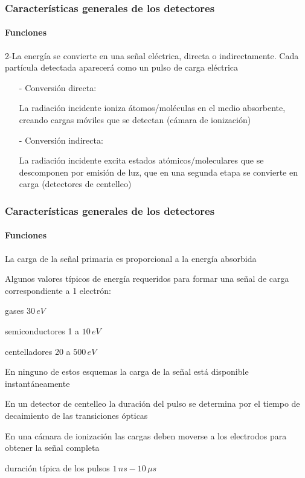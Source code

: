 \documentclass{beamer}
\begin{document}
\begin{frame}
\frametitle{Caracter\'isticas generales de los detectores}
\framesubtitle{{\color{blue}Funciones}}
\begin{block}{2-La energ\'ia se convierte en una señal el\'ectrica, directa o
indirectamente. Cada part\'icula detectada aparecer\'a como un pulso de carga
el\'ectrica}
\begin{itemize}
\item[-] {\color[rgb]{0.5,0,0.13}Conversi\'on directa:}

La radiaci\'on incidente ioniza \'atomos/mol\'eculas en el medio absorbente,
creando cargas m\'oviles que se detectan (c\'amara de ionizaci\'on)

\item[-] {\color[rgb]{0.5,0,0.13}Conversi\'on indirecta:}

La radiaci\'on incidente excita estados at\'omicos/moleculares que se descomponen
por emisi\'on de luz, que en una segunda etapa se convierte en carga (detectores
de centelleo)
\end{itemize}
\end{block}
\end{frame} 

\begin{frame}
\frametitle{Caracter\'isticas generales de los detectores}
\framesubtitle{{\color{blue}Funciones}}
\small{{\color{blue}La carga de la señal primaria es proporcional a la energ\'ia
absorbida}}

\small{Algunos valores t\'ipicos de energ\'ia requeridos para formar una señal de carga
correspondiente a 1 electr\'on:}
\begin{center}
gases\hspace{2cm}   \alert{$30\,eV$}

semiconductores\hspace{1cm}   \alert{1 a $10\,eV$ }

centelladores\hspace{1.9cm}    \alert{20 a $500\,eV$}
\end{center}
\begin{alertblock}{\small{En ninguno de estos esquemas la carga de la señal est\'a
disponible instant\'aneamente}}
\small{En un detector de centelleo la duraci\'on del pulso se determina por el tiempo de
decaimiento de las transiciones \'opticas

En una c\'amara de ionizaci\'on las cargas deben moverse a los electrodos para
obtener la señal completa}

\begin{center}
duraci\'on t\'ipica de los pulsos\hspace{.5cm} \alert{$1\,ns - 10\,\mu s$}  
\end{center}
\end{alertblock}
\end{frame} 
\end{document}
